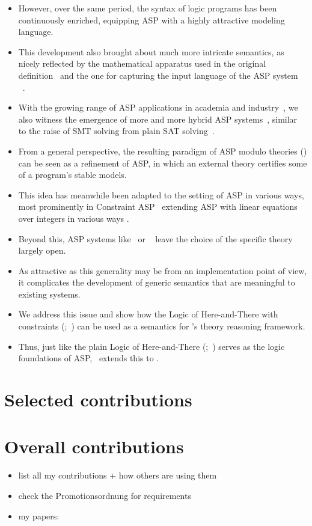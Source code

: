 \begin{itemize}
    \begin{itemize}
      \item 
      However, over the same period, the syntax of logic programs has been continuously enriched,
      equipping ASP with a highly attractive modeling language.
      \item
      This development also brought about much more intricate semantics,
      as nicely reflected by the mathematical apparatus used in the original definition~\cite{gellif88b} and the one for
      capturing the input language of the ASP system \clingo~\cite{gehakalisc15a}.
      \item
      With the growing range of ASP applications in academia and industry~\cite{fafrsctate18a}, %
      we also witness the emergence of more and more hybrid ASP systems~\cite{lierler14a,kascwa17a},
      similar to the raise of SMT solving from plain SAT solving~\cite{baseseti09a}.
      \item 
      From a general perspective, the resulting paradigm of ASP modulo theories (\AMT) can be seen as a refinement of ASP,
      in which an external theory certifies some of a program's stable models.
      \item
      This idea has meanwhile been adapted to the setting of ASP in various ways, most prominently in
      Constraint ASP~\cite{lierler14a} extending ASP with linear equations over integers in various ways
      \cite{elposo04a,geossc09a,drewal10a,ostsch12a,roeireri15a,bakaossc16a,jakaosscscwa17a}.
      \item
      Beyond this, ASP systems like \clingo\ or \dlvhex~\cite{eigeiakarescwe18a} leave the choice of the specific
      theory largely open.
      \item 
      As attractive as this generality may be from an implementation point of view,
      it complicates the development of generic semantics that are meaningful to existing systems.
      \item
      We address this issue and show how the Logic of Here-and-There with constraints (\HTC;~\cite{cakaossc16a})
      can be used as a semantics for \clingo's theory reasoning framework.
      \item
      Thus, just like the plain Logic of Here-and-There (\HT;~\cite{heyting30a,pearce96a}) serves as the logic foundations of ASP,
      \HTC\ extends this to \AMT.
    \end{itemize}
\end{itemize}

\section{Selected contributions}

\section{Overall contributions}

\begin{itemize}
  \item list all my contributions + how others are using them
\end{itemize}

\begin{itemize}
  \item check the Promotionsordnung for requirements
  \item my papers: \cites{}
\end{itemize}
